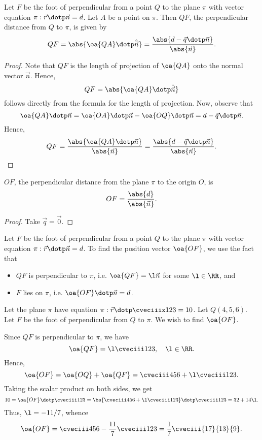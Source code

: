 \begin{proposition}
    Let $F$ be the foot of perpendicular from a point $Q$ to the plane $\pi$ with vector equation $\pi : \vec r \dotp \vec n = d$. Let $A$ be a point on $\pi$. Then $QF$, the perpendicular distance from $Q$ to $\pi$, is given by \[QF = \abs{\oa{QA} \dotp \hat{\vec n}} = \frac{\abs{d - \vec q \dotp \vec n}}{\abs{\vec n}}.\]
\end{proposition}
\begin{proof}
    Note that $QF$ is the length of projection of $\oa{QA}$ onto the normal vector $\vec n$. Hence, \[QF = \abs{\oa{QA} \dotp \hat{\vec n}}\] follows directly from the formula for the length of projection. Now, observe that \[\oa{QA} \dotp \vec n = \oa{OA} \dotp \vec n - \oa{OQ} \dotp \vec n = d - \vec q \dotp \vec n.\] Hence, \[QF = \frac{\abs{\oa{QA} \dotp \vec n}}{\abs{\vec n}} = \frac{\abs{d - \vec q \dotp \vec n}}{\abs{\vec n}}.\]
\end{proof}

\begin{corollary}
    $OF$, the perpendicular distance from the plane $\pi$ to the origin $O$, is \[OF = \frac{\abs{d}}{\abs{\vec n}}.\]
\end{corollary}
\begin{proof}
    Take $\vec q = \vec 0$.
\end{proof}

\begin{method}
    Let $F$ be the foot of perpendicular from a point $Q$ to the plane $\pi$ with vector equation $\pi : \vec r \dotp \vec n = d$. To find the position vector $\oa{OF}$, we use the fact that
    \begin{itemize}
        \item $QF$ is perpendicular to $\pi$, i.e. $\oa{QF} = \l \vec n$ for some $\l \in \RR$, and
        \item $F$ lies on $\pi$, i.e. $\oa{OF} \dotp \vec n = d$.
    \end{itemize}
\end{method}

\begin{example}
    Let the plane $\pi$ have equation $\pi : \vec r \dotp \cveciiix123 = 10$. Let $Q(4, 5, 6)$. Let $F$ be the foot of perpendicular from $Q$ to $\pi$. We wish to find $\oa{OF}$.

    Since $QF$ is perpendicular to $\pi$, we have \[\oa{QF} = \l \cveciii123, \quad \l \in \RR.\] Hence, \[\oa{OF} = \oa{OQ} + \oa{QF} = \cveciii456 + \l\cveciii123.\] Taking the scalar product on both sides, we get \[10 = \oa{OF} \dotp \cveciii123 = \bs{\cveciii456 + \l\cveciii123} \dotp \cveciii123 = 32 + 14\l.\] Thus, $\l = -11/7$, whence \[\oa{OF} = \cveciii456 - \frac{11}{7}\cveciii123 = \frac17 \cveciii{17}{13}{9}.\]
\end{example}

